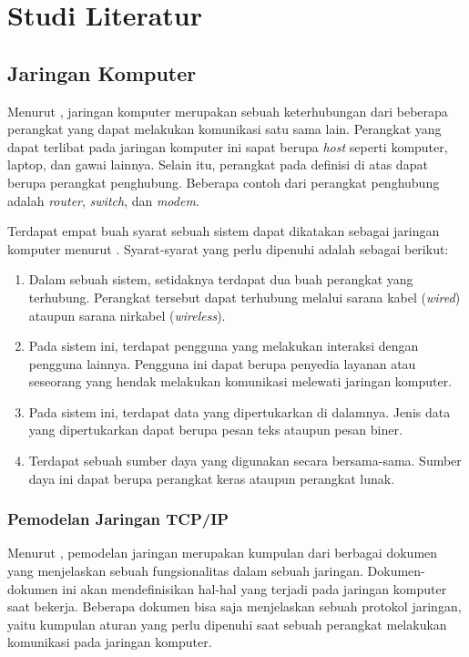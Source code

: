 \chapter{Studi Literatur}

\section{Jaringan Komputer}
\label{sec:jaringan-komputer}

Menurut \textcite{forouzan2012}, jaringan komputer merupakan sebuah keterhubungan dari beberapa perangkat yang dapat melakukan komunikasi satu sama lain. Perangkat yang dapat terlibat pada jaringan komputer ini sapat berupa \emph{host} seperti komputer, laptop, dan gawai lainnya. Selain itu, perangkat pada definisi di atas dapat berupa perangkat penghubung. Beberapa contoh dari perangkat penghubung adalah \emph{router}, \emph{switch}, dan \emph{modem}.

Terdapat empat buah syarat sebuah sistem dapat dikatakan sebagai jaringan komputer menurut \textcite{pratama2015}. Syarat-syarat yang perlu dipenuhi adalah sebagai berikut:
\begin{enumerate}
  \item Dalam sebuah sistem, setidaknya terdapat dua buah perangkat yang terhubung. Perangkat tersebut dapat terhubung melalui sarana kabel (\emph{wired}) ataupun sarana nirkabel (\emph{wireless}).
  \item Pada sistem ini, terdapat pengguna yang melakukan interaksi dengan pengguna lainnya. Pengguna ini dapat berupa penyedia layanan atau seseorang yang hendak melakukan komunikasi melewati jaringan komputer.
  \item Pada sistem ini, terdapat data yang dipertukarkan di dalamnya. Jenis data yang dipertukarkan dapat berupa pesan teks ataupun pesan biner.
  \item Terdapat sebuah sumber daya yang digunakan secara bersama-sama. Sumber daya ini dapat berupa perangkat keras ataupun perangkat lunak.
\end{enumerate}

\subsection{Pemodelan Jaringan TCP/IP}
Menurut \textcite{odom2022}, pemodelan jaringan merupakan kumpulan dari berbagai dokumen yang menjelaskan sebuah fungsionalitas dalam sebuah jaringan. Dokumen-dokumen ini akan mendefinisikan hal-hal yang terjadi pada jaringan komputer saat bekerja. Beberapa dokumen bisa saja menjelaskan sebuah protokol jaringan, yaitu kumpulan aturan yang perlu dipenuhi saat sebuah perangkat melakukan komunikasi pada jaringan komputer.

